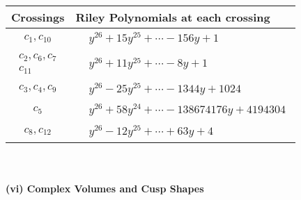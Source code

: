 \documentclass[1p]{elsarticle_modified}
\theoremstyle{definition}
\begin{document}
\begin{tabular}{m{50pt}|m{274pt}}
Crossings & \hspace{64pt}Riley Polynomials at each crossing \\
\hline $$\begin{aligned}c_{1},c_{10}\end{aligned}$$&$\begin{aligned}
&y^{26}+15 y^{25}+\cdots-156 y+1
\end{aligned}$\\
\hline $$\begin{aligned}c_{2},c_{6},c_{7}\\c_{11}\end{aligned}$$&$\begin{aligned}
&y^{26}+11 y^{25}+\cdots-8 y+1
\end{aligned}$\\
\hline $$\begin{aligned}c_{3},c_{4},c_{9}\end{aligned}$$&$\begin{aligned}
&y^{26}-25 y^{25}+\cdots-1344 y+1024
\end{aligned}$\\
\hline $$\begin{aligned}c_{5}\end{aligned}$$&$\begin{aligned}
&y^{26}+58 y^{24}+\cdots-138674176 y+4194304
\end{aligned}$\\
\hline $$\begin{aligned}c_{8},c_{12}\end{aligned}$$&$\begin{aligned}
&y^{26}-12 y^{25}+\cdots+63 y+4
\end{aligned}$\\
\hline
\end{tabular}\\~\\
\newpage\flushleft \textbf{(vi) Complex Volumes and Cusp Shapes}
\end{document}
